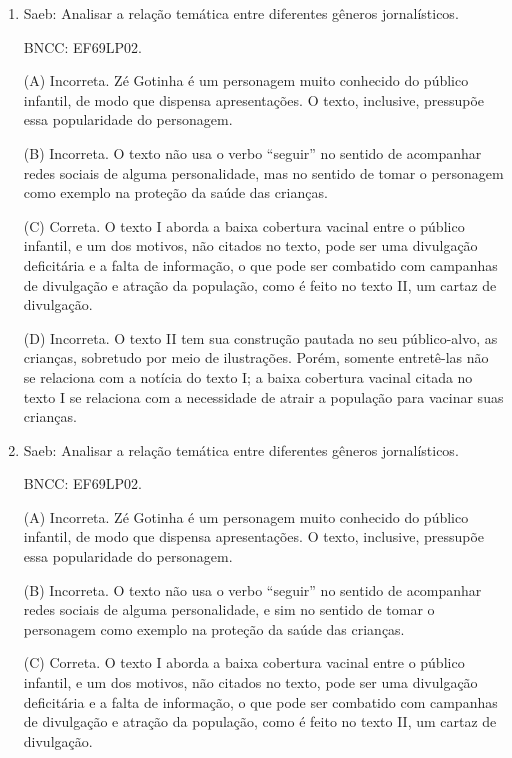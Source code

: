 \begin{enumerate}
(D) Incorreta. O texto não cita fatores de risco, diz apenas que o
contágio é viral. Um fator de risco, por exemplo, para uma doença viral,
é frequentar locais fechados com grande público.

\item

Saeb: Analisar a relação temática entre diferentes gêneros
jornalísticos.

BNCC: EF69LP02.

(A) Incorreta. Zé Gotinha é um personagem muito conhecido do público
infantil, de modo que dispensa apresentações. O texto, inclusive,
pressupõe essa popularidade do personagem.

(B) Incorreta. O texto não usa o verbo ``seguir'' no sentido de
acompanhar redes sociais de alguma personalidade, mas no sentido de
tomar o personagem como exemplo na proteção da saúde das crianças.

(C) Correta. O texto I aborda a baixa cobertura vacinal entre o público
infantil, e um dos motivos, não citados no texto, pode ser uma
divulgação deficitária e a falta de informação, o que pode ser combatido
com campanhas de divulgação e atração da população, como é feito no
texto II, um cartaz de divulgação.

(D) Incorreta. O texto II tem sua construção pautada no seu
público-alvo, as crianças, sobretudo por meio de ilustrações. Porém,
somente entretê-las não se relaciona com a notícia do texto I; a baixa
cobertura vacinal citada no texto I se relaciona com a necessidade de
atrair a população para vacinar suas crianças.

\item

Saeb: Analisar a relação temática entre diferentes gêneros
jornalísticos.

BNCC: EF69LP02.

(A) Incorreta. Zé Gotinha é um personagem muito conhecido do público
infantil, de modo que dispensa apresentações. O texto, inclusive,
pressupõe essa popularidade do personagem.

(B) Incorreta. O texto não usa o verbo ``seguir'' no sentido de
acompanhar redes sociais de alguma personalidade, e sim no sentido de
tomar o personagem como exemplo na proteção da saúde das crianças.

(C) Correta. O texto I aborda a baixa cobertura vacinal entre o público
infantil, e um dos motivos, não citados no texto, pode ser uma
divulgação deficitária e a falta de informação, o que pode ser combatido
com campanhas de divulgação e atração da população, como é feito no
texto II, um cartaz de divulgação.


\end{enumerate}
